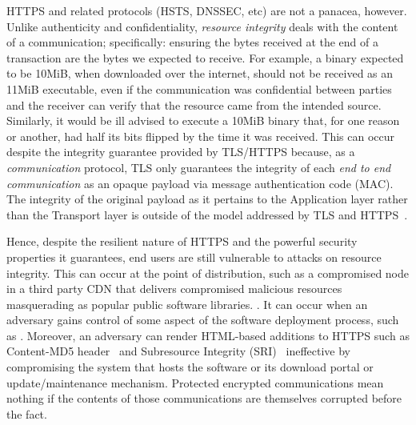 HTTPS and related protocols (HSTS, DNSSEC, etc) are not a panacea, however.
Unlike authenticity and confidentiality, \textit{resource integrity} deals with
the content of a communication; specifically: ensuring the bytes received at the
end of a transaction are the bytes we expected to receive. For example, a binary
expected to be 10MiB, when downloaded over the internet, should not be received
as an 11MiB executable, even if the communication was confidential between
parties and the receiver can verify that the resource came from the intended
source. Similarly, it would be ill advised to execute a 10MiB binary that, for
one reason or another, had half its bits flipped by the time it was received.
This can occur despite the integrity guarantee provided by TLS/HTTPS because, as
a \textit{communication} protocol, TLS only guarantees the integrity of each
\textit{end to end communication} as an opaque payload via message
authentication code (MAC). The integrity of the original payload as it pertains
to the Application layer rather than the Transport layer is outside of the model
addressed by TLS and HTTPS~\cite{TLS1.2, HTTPS}.

Hence, despite the resilient nature of HTTPS and the powerful security
properties it guarantees, end users are still vulnerable to attacks on resource
integrity. This can occur at the point of distribution, such as a compromised
node in a third party CDN that delivers compromised malicious resources
masquerading as popular public software libraries. . It can occur when an adversary gains control of some
aspect of the software deployment process, such as . Moreover, an adversary can render HTML-based additions to HTTPS
such as Content-MD5 header~\cite{MD5Header} and Subresource Integrity
(SRI)~\cite{SRI} ineffective by compromising the system that hosts the software
or its download portal or update/maintenance mechanism. Protected encrypted
communications mean nothing if the contents of those communications are
themselves corrupted before the fact.








